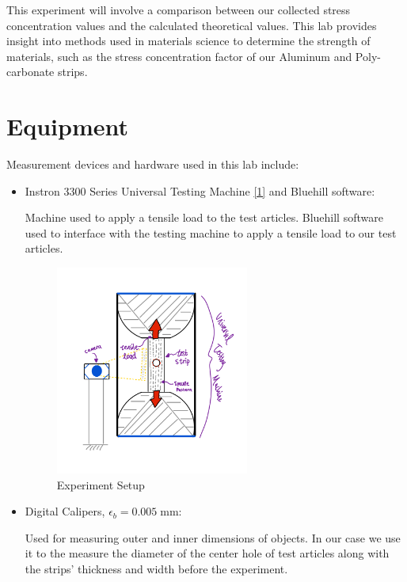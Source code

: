 \documentclass{article}
\begin{document}
This experiment will involve a comparison between our collected stress concentration values and the calculated theoretical values. This lab provides insight into methods used in materials science to determine the strength of materials, such as the stress concentration factor of our Aluminum and Poly-carbonate strips.

\section{Equipment}
Measurement devices and hardware used in this lab include:
\begin{itemize}

\item Instron 3300 Series Universal Testing Machine \hyperlink{1}{[1]} and Bluehill software: 
\vspace{1mm}

Machine used to apply a tensile load to the test articles. Bluehill software used to interface with the testing machine to apply a tensile load to our test articles.
\begin{figure}[H]
    \centering
    \includegraphics[width = 0.6\textwidth]{lab9images/lab9_emech_setup.png}
    \caption{Experiment Setup}
    \label{fig:setup9}
\end{figure}
\vspace{2.5mm}

\item Digital Calipers, $\epsilon_{b} = 0.005\; \text{mm}$: 
\vspace{1mm}

Used for measuring outer and inner dimensions of objects. In our case we use it to the measure the diameter of the center hole of test articles along with the strips' thickness and width before the experiment.
\vspace{2.5mm}


\end{itemize}
\end{document}
